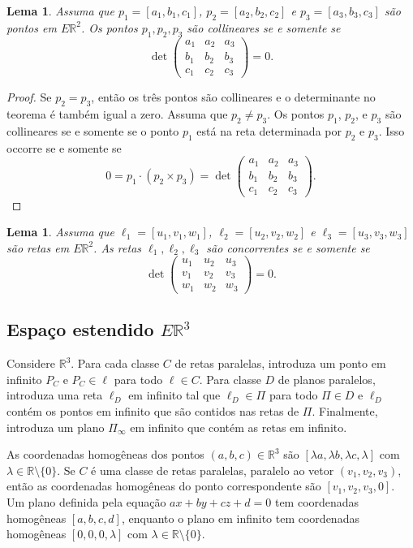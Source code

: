 \documentclass[12pt]{amsart}
\newcommand{\R}{\mathbb R}
\newtheorem{lemma}[theorem]{Lema}
\theoremstyle{definition}
\begin{document}
\begin{lemma}
    Assuma que $p_1=[a_1,b_1,c_1]$, $p_2=[a_2,b_2,c_2]$ e $p_3=[a_3,b_3,c_3]$ são pontos em $E\R^2$. 
    Os pontos $p_1,p_2,p_3$ são collineares se e somente se
    \[
        \det\begin{pmatrix} a_1 & a_2 & a_3\\ b_1 & b_2 & b_3\\ c_1 & c_2 & c_3\end{pmatrix}=0.
    \]
\end{lemma}
\begin{proof}
    Se $p_2=p_3$, então os três pontos são collineares e o determinante no teorema é também igual a zero. 
    Assuma que $p_2\neq p_3$.
    Os pontos $p_1$, $p_2$, e $p_3$ são collineares se e somente se o ponto $p_1$ está na reta determinada 
    por $p_2$ e $p_3$. Isso occorre se e somente se 
    \[
        0=p_1\cdot (p_2\times p_3)=\det\begin{pmatrix} a_1 & a_2 & a_3\\ b_1 & b_2 & b_3\\ c_1 & c_2 & c_3\end{pmatrix}.
    \]
\end{proof}

\begin{lemma}
    Assuma que $\ell_1=[u_1,v_1,w_1]$, $\ell_2=[u_2,v_2,w_2]$ e $\ell_3=[u_3,v_3,w_3]$ são retas em $E\R^2$. 
    As retas $\ell_1,\ell_2,\ell_3$ são concorrentes se e somente se
    \[
        \det\begin{pmatrix} u_1 & u_2 & u_3\\ v_1 & v_2 & v_3\\ w_1 & w_2 & w_3\end{pmatrix}=0.
    \]
\end{lemma}

\subsection{Espaço estendido $E\R^3$}
Considere $\R^3$. Para cada classe $C$ de retas paralelas, introduza um ponto em infinito $P_C$ 
e $P_C \in\ell$ para todo $\ell \in C$. Para classe $D$ de planos paralelos, introduza uma reta $\ell_D$ 
em infinito tal que $\ell_D\in \Pi$ para todo $\Pi\in D$ e $\ell_D$ contém os pontos em infinito que 
são contidos nas retas de $\Pi$. Finalmente, introduza um plano $\Pi_\infty$ em infinito que contém 
as retas em infinito.

As coordenadas homogêneas dos pontos $(a,b,c)\in\R^3$ são $[\lambda a,\lambda b,\lambda c,\lambda]$ 
com $\lambda\in\R\setminus\{0\}$. Se $C$ é uma classe de retas paralelas, paralelo ao vetor $(v_1,v_2,v_3)$, 
então as coordenadas homogêneas do ponto correspondente são $[v_1,v_2,v_3,0]$. 
Um plano definida pela equação $ax+by+cz+d=0$ tem coordenadas homogêneas $[a,b,c,d]$, enquanto o plano em 
infinito tem coordenadas homogêneas $[0,0,0,\lambda]$ com $\lambda\in\R\setminus\{0\}$. 
\end{document}
